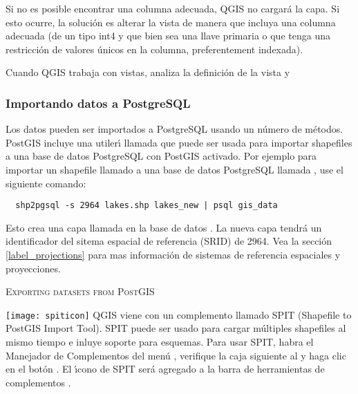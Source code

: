 Si no es posible encontrar una columna adecuada, QGIS no cargar\'a la capa. Si esto ocurre, la soluci\'on es alterar la vista de manera que incluya una columna adecuada (de un tipo int4 y que bien sea una llave primaria o que tenga una restricci\'on de valores \'unicos en la columna, preferentement indexada). 

Cuando QGIS trabaja con vistas, analiza la definici\'on de la vista y 

\subsubsection{Importando datos a PostgreSQL}\label{sec:loading_postgis_data}  
Los datos pueden ser importados a PostgreSQL usando un n\'umero de m\'etodos. PostGIS
incluye una utiler\'{\i} llamada  que puede ser usada para importar shapefiles a una base de datos PostgreSQL con PostGIS activado. Por ejemplo para importar un shapefile llamado  a una base de datos PostgreSQL llamada , use el siguiente comando:

\begin{verbatim} 
  shp2pgsql -s 2964 lakes.shp lakes_new | psql gis_data
\end{verbatim}

Esto crea una capa llamada  en la base de datos . La nueva capa tendr\'a un identificador del sitema espacial de referencia (SRID) de 2964. Vea la secci\'on \ref{label_projections} para mas informaci\'on de sistemas de referencia espaciales y proyecciones.

\begin{Tip}
\caption{\textsc{Exporting datasets from PostGIS}}
\end{Tip}

\texttt{[image: spiticon]} QGIS viene con un complemento llamado 
SPIT (Shapefile to PostGIS Import Tool).
SPIT puede ser usado para cargar m\'ultiples shapefiles al mismo tiempo e inluye soporte para esquemas. Para usar SPIT, habra el Manejador de Complementos del men\'u , verifique la caja siguiente al  y haga clic en el bot\'on . El \'{\i}cono de SPIT ser\'a agregado a la barra de herramientas de complementos . 

